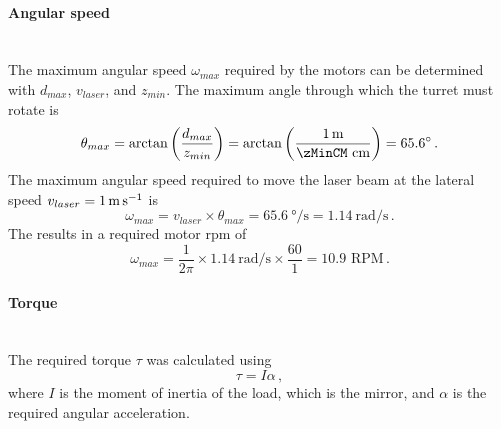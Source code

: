 \paragraph{Angular speed}\mbox{}\\
The maximum angular speed $\omega_{max}$ required by the motors can be determined with $d_{max}$, $v_{laser}$, and $z_{min}$. The maximum angle through which the turret must rotate is
\begin{equation}
    \theta_{max} = \arctan\left({\frac{d_{max}}{z_{min}}}\right) = \arctan\left({\frac{\SI{1}{\meter}}{\zMinCM \text{ cm}}}\right) = 65.6\degree\,.
\end{equation}
The maximum angular speed required to move the laser beam at the lateral speed $v_{laser} = \SI{1}{\meter\per\second}$ is
\begin{equation}
    \omega_{max} = v_{laser} \times \theta_{max} = \SI{65.6}{\degree\per\second} = \SI{1.14}{\radian\per\second}\,.
\end{equation}
The results in a required motor \gls{rpm} of
\begin{equation}
    \omega_{max} = \frac{1}{2\pi} \times \SI{1.14}{\radian\per\second} \times \frac{60}{1} = 10.9 \text{ RPM}\,.
\end{equation}


\paragraph{Torque}\hfill\\
The required torque $\tau$ was calculated using
\begin{equation}
    \tau = I\alpha\,,
    \label{eq:torque}
\end{equation}
where $I$ is the moment of inertia of the load, which is the mirror, and $\alpha$ is the required angular acceleration.



